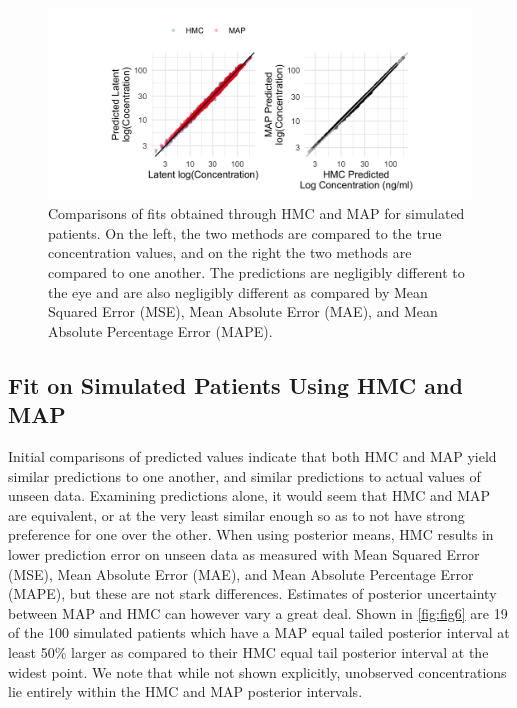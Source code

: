 \begin{figure}
	\centering
	\includegraphics[width=1\linewidth]{figs/compare}
	\caption{Comparisons of fits obtained through HMC and MAP for simulated patients.  On the left, the two methods are compared to the true concentration values, and on the right the two methods are compared to one another.  The predictions are negligibly different to the eye and are also negligibly different as compared by Mean Squared Error (MSE), Mean Absolute Error (MAE), and Mean Absolute Percentage Error (MAPE).}
	\label{fig:fig5}
\end{figure}



\subsection*{Fit on Simulated Patients Using HMC and MAP}

Initial comparisons of predicted values indicate that both HMC and MAP yield similar predictions to one another, and similar predictions to actual values of unseen data.  Examining predictions alone, it would seem that HMC and MAP are equivalent, or at the very least similar enough so as to not have strong preference for one over the other. When using posterior means, HMC results in lower prediction error on unseen data as measured with Mean Squared Error (MSE), Mean Absolute Error (MAE), and Mean Absolute Percentage Error (MAPE), but these are not stark differences. Estimates of posterior uncertainty between MAP and HMC can however vary a great deal. Shown in \cref{fig:fig6} are 19 of the 100 simulated patients which have a MAP equal tailed posterior interval at least 50\% larger as compared to their HMC equal tail posterior interval at the widest point. We note that while not shown explicitly, unobserved concentrations lie entirely within the HMC and MAP posterior intervals.



